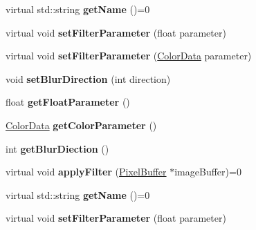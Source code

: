 \begin{DoxyCompactItemize}
\item 
\hypertarget{classFilter_a212f40acb6481b2e36c3d129007519f1}{virtual std\-::string {\bfseries get\-Name} ()=0}\label{classFilter_a212f40acb6481b2e36c3d129007519f1}

\item 
\hypertarget{classFilter_aba015e9da647ba41fee4b41019d54516}{virtual void {\bfseries set\-Filter\-Parameter} (float parameter)}\label{classFilter_aba015e9da647ba41fee4b41019d54516}

\item 
\hypertarget{classFilter_a88314088e678c9a7cdbe0d0557385fa8}{virtual void {\bfseries set\-Filter\-Parameter} (\hyperlink{classColorData}{Color\-Data} parameter)}\label{classFilter_a88314088e678c9a7cdbe0d0557385fa8}

\item 
\hypertarget{classFilter_ada9d5f112e217c9bcf413093eae2a1e9}{void {\bfseries set\-Blur\-Direction} (int direction)}\label{classFilter_ada9d5f112e217c9bcf413093eae2a1e9}

\item 
\hypertarget{classFilter_a9f741b045bf1d57e485f116ce62ebac1}{float {\bfseries get\-Float\-Parameter} ()}\label{classFilter_a9f741b045bf1d57e485f116ce62ebac1}

\item 
\hypertarget{classFilter_abf85cdf0cda6dbe1dbcd6b8813aeecf3}{\hyperlink{classColorData}{Color\-Data} {\bfseries get\-Color\-Parameter} ()}\label{classFilter_abf85cdf0cda6dbe1dbcd6b8813aeecf3}

\item 
\hypertarget{classFilter_a465a168fc580c773e58d4df2f3db5968}{int {\bfseries get\-Blur\-Diection} ()}\label{classFilter_a465a168fc580c773e58d4df2f3db5968}

\item 
\hypertarget{classFilter_a2ecb4bc0e81851d30f46f30bf81d1739}{virtual void {\bfseries apply\-Filter} (\hyperlink{classPixelBuffer}{Pixel\-Buffer} $\ast$image\-Buffer)=0}\label{classFilter_a2ecb4bc0e81851d30f46f30bf81d1739}

\item 
\hypertarget{classFilter_a212f40acb6481b2e36c3d129007519f1}{virtual std\-::string {\bfseries get\-Name} ()=0}\label{classFilter_a212f40acb6481b2e36c3d129007519f1}

\item 
\hypertarget{classFilter_aba015e9da647ba41fee4b41019d54516}{virtual void {\bfseries set\-Filter\-Parameter} (float parameter)}\label{classFilter_aba015e9da647ba41fee4b41019d54516}


\end{DoxyCompactItemize}
